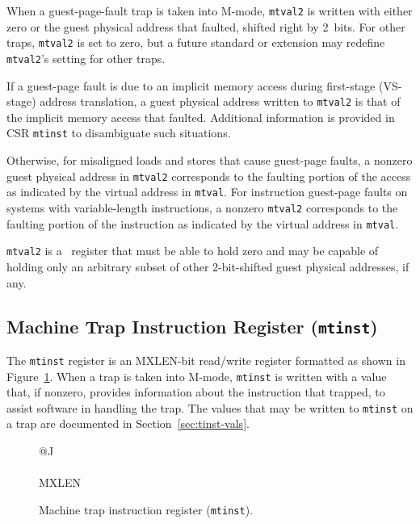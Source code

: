 When a guest-page-fault trap is taken into M-mode, {\tt mtval2} is
written with either zero or the guest physical address that faulted,
shifted right by 2~bits.
For other traps, {\tt mtval2} is set to zero, but a future standard or
extension may redefine {\tt mtval2}'s setting for other traps.

If a guest-page fault is due to an implicit memory access during
first-stage (VS-stage) address translation, a guest physical address
written to {\tt mtval2} is that of the implicit memory access that
faulted.
Additional information is provided in CSR {\tt mtinst} to disambiguate
such situations.

Otherwise, for misaligned loads and stores that cause guest-page faults,
a nonzero guest physical address in {\tt mtval2} corresponds to the
faulting portion of the access as indicated by the virtual address in
{\tt mtval}.
For instruction guest-page faults on systems with variable-length
instructions, a nonzero {\tt mtval2} corresponds to the faulting portion
of the instruction as indicated by the virtual address in {\tt mtval}.

{\tt mtval2} is a \warl\ register that must be able to hold zero and may
be capable of holding only an arbitrary subset of other 2-bit-shifted
guest physical addresses, if any.

\subsection{Machine Trap Instruction Register ({\tt mtinst})}

The {\tt mtinst} register is an MXLEN-bit read/write register formatted
as shown in Figure~\ref{mtinstreg}.
When a trap is taken into M-mode, {\tt mtinst} is written with a value
that, if nonzero, provides information about the instruction that
trapped, to assist software in handling the trap.
The values that may be written to {\tt mtinst} on a trap are documented
in Section~\ref{sec:tinst-vals}.

\begin{figure}[h!]
{\footnotesize
\begin{center}
\begin{tabular}{@{}J}
 \\
\hline
{} \\
\hline
MXLEN \\
\end{tabular}
\end{center}
}
\vspace{-0.1in}
\caption{Machine trap instruction register ({\tt mtinst}).}
\label{mtinstreg}
\end{figure}

